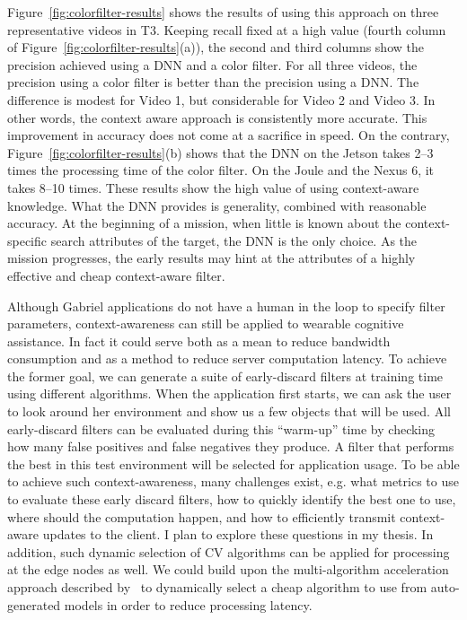Figure~\ref{fig:colorfilter-results} shows the results of using this
approach on three representative videos in T3.  Keeping recall fixed
at a high value (fourth column of
Figure~\ref{fig:colorfilter-results}(a)), the second and third columns
show the precision achieved using a DNN and a color filter.  For all
three videos, the precision using a color filter is better than the
precision using a DNN.  The difference is modest for Video 1, but
considerable for Video 2 and Video 3.  In other words, the context
aware approach is consistently more accurate.  This improvement in
accuracy does not come at a sacrifice in speed.  On the contrary,
Figure~\ref{fig:colorfilter-results}(b) shows that the DNN on the
Jetson takes 2--3 times the processing time of the color filter.  On
the Joule and the Nexus 6, it takes 8--10 times.  These results show
the high value of using context-aware knowledge.  What the DNN
provides is generality, combined with reasonable accuracy.  At the
beginning of a mission, when little is known about the
context-specific search attributes of the target, the DNN is the only
choice.  As the mission progresses, the early results may hint at the
attributes of a highly effective and cheap context-aware filter.

Although Gabriel applications do not have a human in the loop to specify filter
parameters, context-awareness can still be applied to wearable cognitive
assistance. In fact it could serve both as a mean to reduce bandwidth
consumption and as a method to reduce server computation latency. To achieve the
former goal, we can generate a suite of early-discard filters at training time
using different algorithms. When the application first starts, we can ask the
user to look around her environment and show us a few objects that will be used.
All early-discard filters can be evaluated during this ``warm-up'' time by
checking how many false positives and false negatives they produce. A filter
that performs the best in this test environment will be selected for application
usage. To be able to achieve such context-awareness, many challenges exist,
e.g. what metrics to use to evaluate these early discard filters, how to quickly
identify the best one to use, where should the computation happen, and how to
efficiently transmit context-aware updates to the client. I plan to explore
these questions in my thesis. In addition, such dynamic selection of CV
algorithms can be applied for processing at the edge nodes as well. We could
build upon the multi-algorithm acceleration approach described
by~\cite{chen2017empirical} to dynamically select a cheap algorithm to use from
auto-generated models in order to reduce processing latency.
